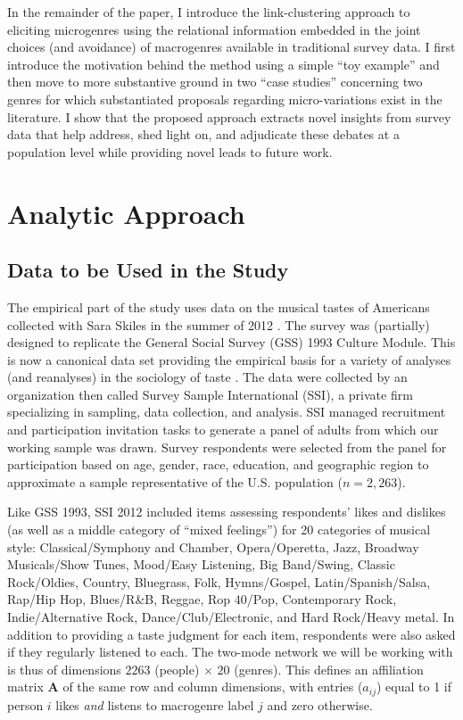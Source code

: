 \documentclass[a4paper,12pt]{article}
\begin{document}
In the remainder of the paper, I introduce the link-clustering approach to eliciting microgenres using the relational information embedded in the joint choices (and avoidance) of macrogenres available in traditional survey data. I first introduce the motivation behind the method using a simple ``toy example'' and then move to more substantive ground in two ``case studies'' concerning two genres for which substantiated proposals regarding micro-variations exist in the literature. I show that the proposed approach extracts novel insights from survey data that help address, shed light on, and adjudicate these debates at a population level while providing novel leads to future work. 

\section{Analytic Approach}
\subsection{Data to be Used in the Study}
The empirical part of the study uses data on the musical tastes of Americans collected with Sara Skiles in the summer of 2012 \citep{lizardo_skiles15, lizardo_skiles16}. The survey was (partially) designed to replicate the General Social Survey (GSS) 1993 Culture Module. This is now a canonical data set providing the empirical basis for a variety of analyses (and reanalyses) in the sociology of taste \citep[e.g.,][]{bryson96, goldberg2011mapping, schultz2010strength, han2003unraveling, tampubolon2008revisiting, okada2017structure}.  The data were collected by an organization then called Survey Sample International (SSI), a private firm specializing in sampling, data collection, and analysis. SSI managed recruitment and participation invitation tasks to generate a panel of adults from which our working sample was drawn. Survey respondents were selected from the panel for participation based on age, gender, race, education, and geographic region to approximate a sample representative of the U.S. population ($n = 2,263$). 

Like GSS 1993, SSI 2012 included items assessing respondents’ likes and dislikes (as well as a middle category of ``mixed feelings'') for 20 categories of musical style: Classical/Symphony and Chamber, Opera/Operetta, Jazz, Broadway Musicals/Show Tunes, Mood/Easy Listening, Big Band/Swing, Classic Rock/Oldies, Country, Bluegrass, Folk, Hymns/Gospel, Latin/Spanish/Salsa, Rap/Hip Hop, Blues/R\&B, Reggae, Rop 40/Pop, Contemporary Rock, Indie/Alternative Rock, Dance/Club/Electronic, and Hard Rock/Heavy metal. In addition to providing a taste judgment for each item, respondents were also asked if they regularly listened to each. The two-mode network we will be working with is thus of dimensions $2263$ (people) $\times$ $20$ (genres). This defines an affiliation matrix $\mathbf{A}$ of the same row and column dimensions, with entries ($a_{ij}$) equal to 1 if person $i$ likes \textit{and} listens to macrogenre label $j$ and zero otherwise. 
\end{document}
